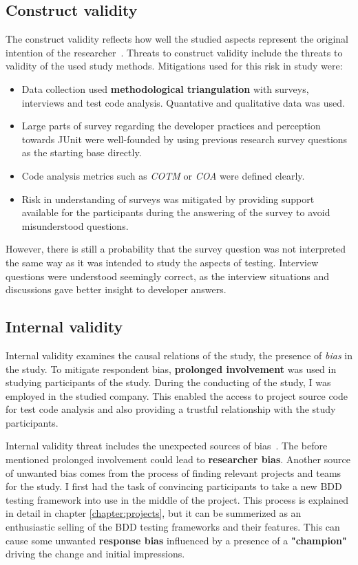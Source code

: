 \subsection{Construct validity}
The construct validity reflects how well the studied aspects represent the original intention of the researcher~\cite{runeson2012case}.
Threats to construct validity include the threats to validity of the used study methods. Mitigations used for this risk
in study were:
\begin{itemize}
\item Data collection used \textbf{methodological triangulation} with surveys, interviews and test code analysis. Quantative and qualitative data was used.
\item Large parts of survey regarding the developer practices and perception towards JUnit were well-founded
by using previous research survey questions as the starting base directly.

\item Code analysis metrics such as \textit{COTM} or \textit{COA} were defined clearly.

\item Risk in understanding of surveys was mitigated by providing support available for the participants during the answering
of the survey to avoid misunderstood questions.

\end{itemize}

\noindent However, there is still a probability
that the survey question was not interpreted the same way as it was intended to study the aspects of testing. Interview questions
were understood seemingly correct, as the interview situations and discussions gave better insight to developer answers.
\subsection{Internal validity}
Internal validity examines the causal relations of the study, the presence of \textit{bias} in the study.
To mitigate respondent bias, \textbf{prolonged involvement} was used in studying participants of the study. During the conducting of the study, I
was employed in the studied company. This enabled the access to project source code for test code analysis and also providing
a trustful relationship with the study participants. ~\cite{runeson2012case}

Internal validity threat includes the unexpected sources of bias~\cite{kitchenham2002preliminary}. The before mentioned
prolonged involvement could lead to \textbf{researcher bias}.
Another source of unwanted bias comes from the process of finding relevant projects and teams for the study.
I first had the task of convincing participants to take a new BDD testing framework into use in the middle of the
project. This process is explained in detail in chapter \ref{chapter:projects}, but it can be summerized as an enthusiastic selling of the
BDD testing frameworks and their features. This can cause some unwanted \textbf{response bias} influenced by a presence
of a \textbf{"champion"}~\cite{kitchenham2002preliminary} driving the change and initial impressions.

